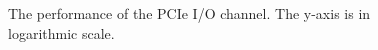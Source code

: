\begin{figure}[t!]
	\centering
\vspace{-10pt}
	\caption{The performance of the PCIe I/O channel. The y-axis is in logarithmic scale. }
\vspace{-14pt}
	\label{fig:pcie}
\end{figure}

